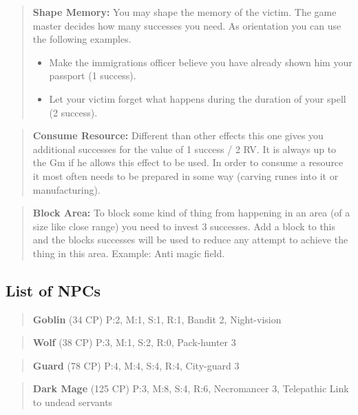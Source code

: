 \documentclass[11pt]{article}
\begin{document}
{\begin{multicols}{2}[]
\begin{quote}
\textbf{Shape Memory:} You may shape the memory of the victim. The game master decides how many successes you need. As orientation you can use the following examples.
\begin{itemize}
\item Make the immigrations officer believe you have already shown him your passport (1 success).
\item Let your victim forget what happens during the duration of your spell (2 success).
\end{itemize}
\end{quote}

\begin{quote}
\textbf{Consume Resource:} Different than other effects this one gives you additional successes for the value of 1 success / 2 RV. It is always up to the Gm if he allows this effect to be used. In order to consume a resource it most often needs to be prepared in some way (carving runes into it or manufacturing).
\end{quote}

\begin{quote}
\textbf{Block Area:} To block some kind of thing from happening in an area (of a size like close range) you need to invest 3 successes. Add a block to this and the blocks successes will be used to reduce any attempt to achieve the thing in this area.
Example: Anti magic field.
\end{quote}



\subsection{List of NPCs}
\label{sec:orga9f3987}
\begin{quote}
\textbf{Goblin} (34 CP)
P:2, M:1, S:1, R:1, Bandit 2, Night-vision
\end{quote}

\begin{quote}
\textbf{Wolf} (38 CP)
P:3, M:1, S:2, R:0, Pack-hunter 3
\end{quote}

\begin{quote}
\textbf{Guard} (78 CP)
P:4, M:4, S:4, R:4, City-guard 3
\end{quote}

\begin{quote}
\textbf{Dark Mage} (125 CP)
P:3, M:8, S:4, R:6, Necromancer 3, Telepathic Link to undead servants
\end{quote}


\end{multicols}}
\end{document}
